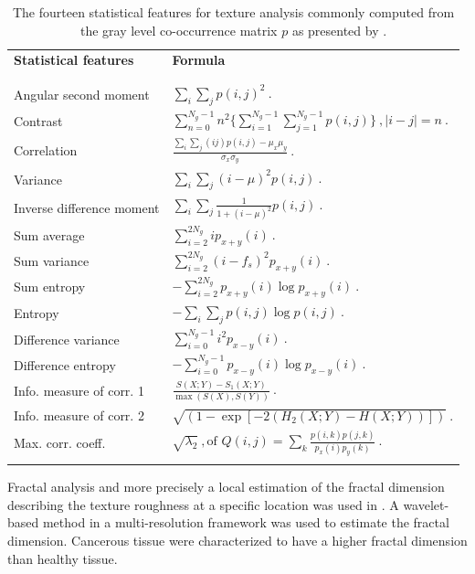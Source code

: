 \begin{table}
	\caption{The fourteen statistical features for texture analysis commonly computed from the gray level co-occurrence matrix $p$ as presented by \cite{Haralick1973}.}
	\small
	\renewcommand{\arraystretch}{1.5}
	\begin{tabular}{p{.4\linewidth} p{.6\linewidth}}
		\hline %
		\textbf{Statistical features} & \textbf{Formula} \\ \\ [-3ex]
		\hline \\ [-1.5ex]
		Angular second moment & $\sum_i \sum_j p(i,j)^2 \ .$  \\
		Contrast & $\sum_{n=0}^{N_g - 1} n^2 \{ \sum_{i=1}^{N_g - 1} \sum_{j=1}^{N_g - 1} p(i,j) \} \ , | i-j |=n \ . $ \\
		Correlation & $\frac{\sum_i \sum_j (ij) p(i,j) - \mu_x \mu_y}{\sigma_x \sigma_y} \ . $ \\
		Variance & $\sum_i \sum_j (i - \mu)^2 p(i,j) \ . $ \\
		Inverse difference moment & $\sum_i \sum_j \frac{1}{1+(i - \mu)^2} p(i,j) \ . $ \\
		Sum average & $\sum_{i=2}^{2N_g} i p_{x+y}(i) \ . $ \\
		Sum variance & $\sum_{i=2}^{2N_g} (i-f_s)^2 p_{x+y}(i) \ . $ \\
		Sum entropy & $ - \sum_{i=2}^{2N_g} p_{x+y}(i) \log p_{x+y}(i) \ . $ \\
		Entropy & $ - \sum_i \sum_j p(i,j) \log p(i,j) \ .$ \\
		Difference variance & $\sum_{i=0}^{N_g-1} i^2 p_{x-y}(i) \ . $ \\
		Difference entropy & $ - \sum_{i=0}^{N_g-1} p_{x-y}(i) \log p_{x-y}(i) \ . $ \\
		Info. measure of corr. 1 & $\frac{S(X;Y)-S_1(X;Y)}{\max(S(X),S(Y))} \ . $ \\
		Info. measure of corr. 2 & $\sqrt{\left( 1 - \exp \left[ -2( H_2(X;Y) - H(X;Y) ) \right] \right)} \ . $ \\
		Max. corr. coeff. & $ \sqrt{\lambda_2} \ , \text{of } Q(i,j) = \sum_k \frac{p(i,k)p(j,k)}{p_x(i)p_y(k)} \ . $ \\
		\\ [-3ex] \hline
	\end{tabular}
	\label{tab:glcm}
\end{table}

Fractal analysis and more precisely a local estimation of the fractal dimension \cite{Benassi1998} describing the texture roughness at a specific location was used in \cite{Lopes2011}.
A wavelet-based method in a multi-resolution framework was used to estimate the fractal dimension.
Cancerous tissue were characterized to have a higher fractal dimension than healthy tissue.

